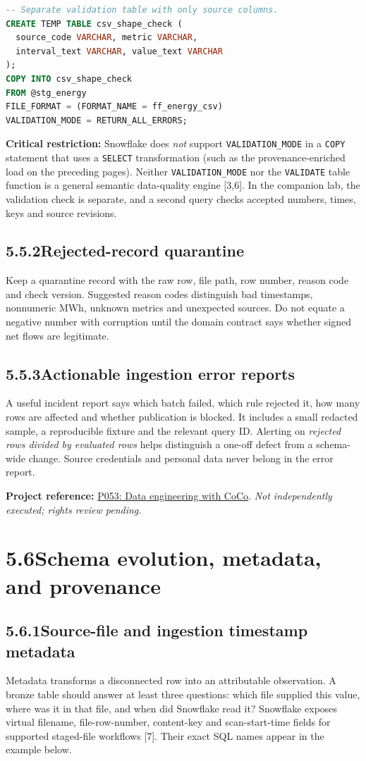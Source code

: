 \documentclass[11pt,twoside]{article}
\newcommand{\topic}[2]{\subsection*{#1\quad #2}}
\newcommand{\repo}[2]{\par\begingroup\fontsize{8.0}{9.6}\selectfont\sffamily\color{inkgray}\textbf{Project reference:} \href{#2}{#1}. \textit{Not independently executed; rights review pending.}\par\endgroup}
\begin{document}
\begin{lstlisting}[language=SQL,caption={Optional structural dry run for a four-column file.}]
-- Separate validation table with only source columns.
CREATE TEMP TABLE csv_shape_check (
  source_code VARCHAR, metric VARCHAR,
  interval_text VARCHAR, value_text VARCHAR
);
COPY INTO csv_shape_check
FROM @stg_energy
FILE_FORMAT = (FORMAT_NAME = ff_energy_csv)
VALIDATION_MODE = RETURN_ALL_ERRORS;
\end{lstlisting}
\textbf{Critical restriction:} Snowflake does \emph{not} support \texttt{VALIDATION\_MODE} in a \texttt{COPY} statement that uses a \texttt{SELECT} transformation (such as the provenance-enriched load on the preceding pages). Neither \texttt{VALIDATION\_MODE} nor the \texttt{VALIDATE} table function is a general semantic data-quality engine [3,6]. In the companion lab, the validation check is separate, and a second query checks accepted numbers, times, keys and source revisions.

\topic{5.5.2}{Rejected-record quarantine}
Keep a quarantine record with the raw row, file path, row number, reason code and check version. Suggested reason codes distinguish bad timestamps, nonnumeric MWh, unknown metrics and unexpected sources. Do not equate a negative number with corruption until the domain contract says whether signed net flows are legitimate.

\topic{5.5.3}{Actionable ingestion error reports}
A useful incident report says which batch failed, which rule rejected it, how many rows are affected and whether publication is blocked. It includes a small redacted sample, a reproducible fixture and the relevant query ID. Alerting on \emph{rejected rows divided by evaluated rows} helps distinguish a one-off defect from a schema-wide change. Source credentials and personal data never belong in the error report.
\repo{P053: Data engineering with CoCo}{https://github.com/Snowflake-Labs/sfguide-data-engineering-with-coco}
\newpage
\section*{5.6\quad Schema evolution, metadata, and provenance}
\topic{5.6.1}{Source-file and ingestion timestamp metadata}
Metadata transforms a disconnected row into an attributable observation. A bronze table should answer at least three questions: which file supplied this value, where was it in that file, and when did Snowflake read it? Snowflake exposes virtual filename, file-row-number, content-key and scan-start-time fields for supported staged-file workflows [7]. Their exact SQL names appear in the example below.
\end{document}

